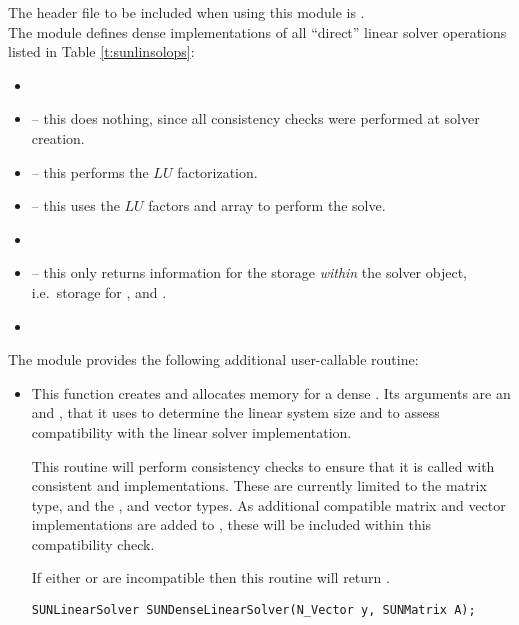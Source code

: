 \noindent The header file to be included when using this module 
is . \\
The {\sunlinsoldense} module defines dense implementations of all
``direct'' linear solver operations listed in
Table \ref{t:sunlinsolops}:
\begin{itemize}
\item {}
\item {} -- this does nothing, since all
  consistency checks were performed at solver creation.
\item {} -- this performs the $LU$ factorization.
\item {} -- this uses the $LU$ factors
  and  array to perform the solve.
\item {}
\item {} -- this only returns information for
  the storage \emph{within} the solver object, i.e.~storage
  for ,  and .
\item {}
\end{itemize}
The module {\sunlinsoldense} provides the following additional
user-callable routine: 
\begin{itemize}


\item {}

  This function creates and allocates memory for a dense .
  Its arguments are an {\nvector} and {\sunmatrix}, that it uses to
  determine the linear system size and to assess compatibility with
  the linear solver implementation.

  This routine will perform consistency checks to ensure that it is
  called with consistent {\nvector} and {\sunmatrix} implementations.
  These are currently limited to the {\sunmatdense} matrix type, and
  the {\nvecs}, {\nvecopenmp} and {\nvecpthreads} vector types.  As
  additional compatible matrix and vector implementations are added to
  {\sundials}, these will be included within this compatibility check.

  If either  or  are incompatible then this routine will
  return .

  \verb|SUNLinearSolver SUNDenseLinearSolver(N_Vector y, SUNMatrix A);|

\end{itemize}
